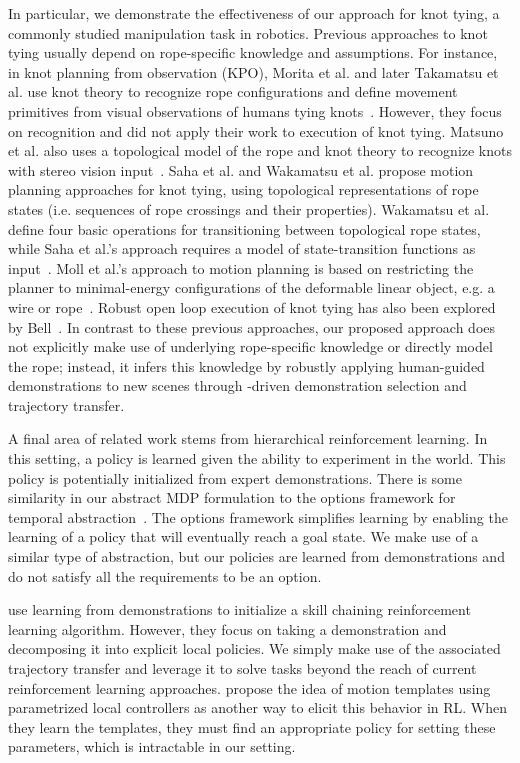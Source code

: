 In particular, we demonstrate the effectiveness of our approach for
knot tying, a commonly studied manipulation task in robotics.
Previous approaches to knot tying usually depend on rope-specific knowledge
and assumptions.
For instance, in knot planning from observation (KPO), Morita et al. and later
Takamatsu et al. use knot theory to recognize rope configurations and define
movement primitives from visual observations of humans tying
knots~\cite{Morita_ICRA2003, Takamatsu_TransRob2006}. However, they focus on
recognition and did not apply their work to execution of knot tying. Matsuno et al.
also uses a topological model of the rope and knot theory to recognize knots with
stereo vision input~\cite{Matsuno_RSJ2006}.
Saha et al. and Wakamatsu et al. propose motion planning approaches for knot tying,
using topological representations of rope states (i.e. sequences of rope crossings
and their properties). Wakamatsu et al. define four basic operations for
transitioning between topological rope states,
while Saha et al.'s approach requires a model of state-transition functions
as input~\cite{Saha_ExpRobotics2008, Wakamatsu_IJRR2006}. Moll et al.'s approach
to motion planning is based on restricting the planner to minimal-energy
configurations of the deformable linear object, e.g. a wire or rope~\cite{Moll_IEEERobot2006}.
Robust open loop execution of knot tying has also been explored by Bell~\cite{Bell_PhD2010}.
In contrast to these previous approaches, our proposed approach does not
explicitly make use of underlying rope-specific
knowledge or directly model the rope; instead, it infers this knowledge by
robustly applying human-guided demonstrations to new scenes through
\mmql{}-driven demonstration selection and trajectory transfer.



A final area of related work stems from hierarchical reinforcement learning. 
In this setting, a policy is learned given the ability to experiment in the world.
This policy is potentially initialized from expert demonstrations.
There is some similarity in our abstract MDP formulation to the options framework for temporal abstraction~\cite{sutton1999between}.
The options framework simplifies learning by enabling the learning of a policy that will eventually reach a goal state.
We make use of a similar type of abstraction, but our policies are learned from demonstrations and do not satisfy all the requirements to be an option.

\citet{konidaris2010constructing} use learning from demonstrations to initialize a skill chaining reinforcement learning algorithm.
However, they focus on taking a demonstration and decomposing it into explicit local policies.
We simply make use of the associated trajectory transfer and leverage it to solve tasks beyond the reach of current reinforcement learning approaches.
\citet{Neumann09learningcomplex} propose the idea of motion templates using parametrized local controllers as another way to elicit this behavior in RL.
When they learn the templates, they must find an appropriate policy for setting these parameters, which is intractable in our setting.
